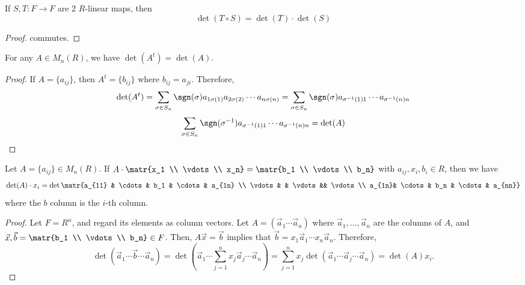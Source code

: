 \begin{prop}
    If $S,T:F \to F$ are 2 $R$-linear maps, then
    $$\det (T \circ S) = \det (T) \cdot \det (S)$$
\end{prop}
\begin{proof}
    commutes.
\end{proof}
\begin{prop}
    For any $A \in M_n(R)$, we have $\det (A^t) = \det (A)$.
\end{prop}

\begin{proof}
    If $A=\{a_{ij}\}$, then $A^t=\{b_{ij}\}$ where $b_{ij}=a_{ji}$. Therefore,
    $$\det (A^t) = \sum_{\sigma \in S_n}\sgn (\sigma) a_{1 \sigma (1)}a_{2 \sigma (2)}\cdots a_{n \sigma (n)} = \sum_{\sigma \in S_n}\sgn (\sigma) a_{\sigma ^{-1}(1) 1}\cdots a_{\sigma ^{-1}(n)n}$$
    $$\sum_{\sigma \in S_n}\sgn (\sigma^{-1}) a_{\sigma ^{-1}(1) 1}\cdots a_{\sigma ^{-1}(n)n}=\det (A)$$
\end{proof}

\begin{thm}
    Let $A = \{a_{ij}\} \in M_{n}(R)$. If $A \cdot \matr{x_1 \\ \vdots \\ x_n}= \matr{b_1 \\ \vdots \\ b_n}$ with $a_{ij},x_i,b_i \in R$, then we have
    $$\det (A) \cdot x_i = \det \matr{a_{11} & \cdots & b_1 & \cdots & a_{1n} \\ \vdots & & \vdots && \vdots \\ a_{1n}& \cdots & b_n & \cdots & a_{nn}}$$
    where the $b$ column is the $i$-th column.
\end{thm}

\begin{proof}
    Let $F= R^n$, and regard its elements as column vectors. Let $A = (\vec a_1 \cdots \vec a_n)$ where $\vec a_1,\dots, \vec a_n$ are the columns of $A$, and $\vec x,\vec b=\matr{b_1 \\ \vdots \\ b_n} \in F$. Then, $A \vec x = \vec b$ implies that $\vec b = x_1 \vec a_1 \cdots x_n \vec a_n$. Therefore,
    $$\det (\vec a_1 \cdots \vec b \cdots \vec a_n) = \det ( \vec a_1 \cdots \sum_{j=1}^nx_j\vec a_j \cdots \vec a_n)=\sum_{j=1}^nx_j \det (\vec a_1 \cdots \vec a_j \cdots \vec a_n) = \det (A) x_i.$$
\end{proof}

